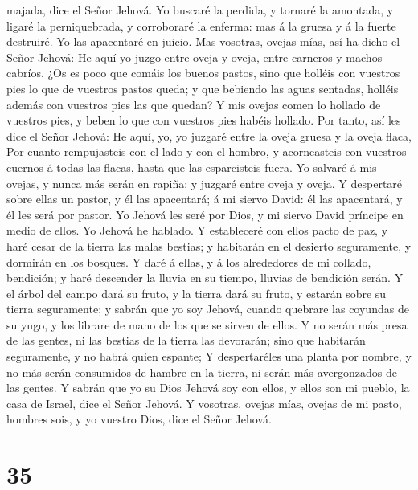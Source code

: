 majada, dice el Señor Jehová.  Yo buscaré la perdida, y
tornaré la amontada, y ligaré la perniquebrada, y corroboraré la
enferma: mas á la gruesa y á la fuerte destruiré. Yo las apacentaré en
juicio.  Mas vosotras, ovejas mías, así ha dicho el Señor
Jehová: He aquí yo juzgo entre oveja y oveja, entre carneros y machos
cabríos.  ¿Os es poco que comáis los buenos pastos, sino
que holléis con vuestros pies lo que de vuestros pastos queda; y que
bebiendo las aguas sentadas, holléis además con vuestros pies las que
quedan?  Y mis ovejas comen lo hollado de vuestros pies, y
beben lo que con vuestros pies habéis hollado.  Por tanto,
así les dice el Señor Jehová: He aquí, yo, yo juzgaré entre la oveja
gruesa y la oveja flaca,  Por cuanto rempujasteis con el
lado y con el hombro, y acorneasteis con vuestros cuernos á todas las
flacas, hasta que las esparcisteis fuera.  Yo salvaré á mis
ovejas, y nunca más serán en rapiña; y juzgaré entre oveja y oveja.
 Y despertaré sobre ellas un pastor, y él las apacentará; á
mi siervo David: él las apacentará, y él les será por pastor.
 Yo Jehová les seré por Dios, y mi siervo David príncipe en
medio de ellos. Yo Jehová he hablado.  Y estableceré con
ellos pacto de paz, y haré cesar de la tierra las malas bestias; y
habitarán en el desierto seguramente, y dormirán en los bosques.
 Y daré á ellas, y á los alrededores de mi collado,
bendición; y haré descender la lluvia en su tiempo, lluvias de bendición
serán.  Y el árbol del campo dará su fruto, y la tierra
dará su fruto, y estarán sobre su tierra seguramente; y sabrán que yo
soy Jehová, cuando quebrare las coyundas de su yugo, y los librare de
mano de los que se sirven de ellos.  Y no serán más presa
de las gentes, ni las bestias de la tierra las devorarán; sino que
habitarán seguramente, y no habrá quien espante;  Y
despertaréles una planta por nombre, y no más serán consumidos de hambre
en la tierra, ni serán más avergonzados de las gentes.  Y
sabrán que yo su Dios Jehová soy con ellos, y ellos son mi pueblo, la
casa de Israel, dice el Señor Jehová.  Y vosotras, ovejas
mías, ovejas de mi pasto, hombres sois, y yo vuestro Dios, dice el Señor
Jehová.

\hypertarget{section-34}{%
\section{35}\label{section-34}}

